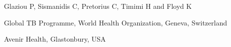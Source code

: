 Glaziou P, Sismanidis C, Pretorius C, Timimi H and Floyd K

Global TB Programme, World Health Organization, Geneva, Switzerland

Avenir Health, Glastonbury, USA